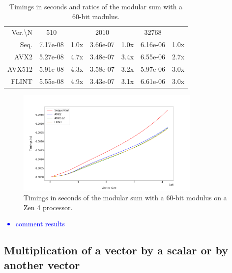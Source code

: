 \documentclass[a4paper]{article}
\begin{document}
\begin{table}[h!]
    \begin{tabular}{|r|*{3}{c c|}}
        \hline
        \rowcolor{myGray}
        \multicolumn{7}{|c|}{\textsc{Zen 4}} \\
        \hline
        \rowcolor{myGray}
        Ver.\textbackslash N & 510 & & 2010 & & 32768 & \\
        \hline
        \cellcolor{myGray} Seq. & 7.17e-08 & 1.0x & 3.66e-07 & 1.0x & 6.16e-06 & 1.0x \\
        \hline
        \cellcolor{myGray} AVX2 & 5.27e-08 & 4.7x & 3.48e-07 & 3.4x & 6.55e-06 & 2.7x \\
        \hline
        \cellcolor{myGray} AVX512 & 5.91e-08 & 4.3x & 3.58e-07 & 3.2x & 5.97e-06 & 3.0x \\
        \hline
        \cellcolor{myGray} FLINT & 5.55e-08 & 4.9x & 3.43e-07 & 3.1x & 6.61e-06 & 3.0x \\
        \hline
    \end{tabular}
    \caption{Timings in seconds and ratios of the modular sum with a 60-bit modulus.}
\end{table}

\begin{figure}[h!]
    \begin{center}
        \includegraphics[width=0.8\textwidth]{add-mod_argiope.png}
    \end{center}
    \caption{Timings in seconds of the modular sum with a 60-bit modulus on a Zen 4 processor.}
\end{figure}

\newpage
\textcolor{blue}{
\begin{itemize}
    \item comment results
\end{itemize}}

\subsection{Multiplication of a vector by a scalar or by another vector}
\end{document}
